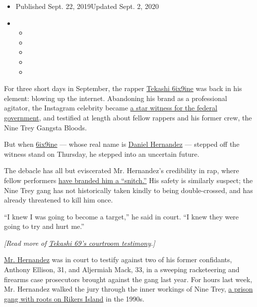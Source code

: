 \begin{itemize}
\item
  Published Sept. 22, 2019Updated Sept. 2, 2020
\item
  \begin{itemize}
  \item
  \item
  \item
  \item
  \item
  \end{itemize}
\end{itemize}

For three short days in September, the rapper
\href{https://www.nytimes3xbfgragh.onion/2020/09/02/arts/music/6ix9ine-interview.html}{Tekashi
6ix9ine} was back in his element: blowing up the internet. Abandoning
his brand as a professional agitator, the Instagram celebrity became
\href{https://www.nytimes3xbfgragh.onion/2019/09/19/nyregion/tekashi-69-case-testimony-jim-jones.html}{a
star witness for the federal government}, and testified at length about
fellow rappers and his former crew, the Nine Trey Gangsta Bloods.

But when
\href{https://www.nytimes3xbfgragh.onion/2019/12/18/nyregion/tekashi-69-sentenced.html}{6ix9ine}
--- whose real name is
\href{https://www.nytimes3xbfgragh.onion/2019/12/18/nyregion/tekashi-69-sentenced.html}{Daniel
Hernandez} --- stepped off the witness stand on Thursday, he stepped
into an uncertain future.

The debacle has all but eviscerated Mr. Hernandez's credibility in rap,
where fellow performers
\href{https://www.nytimes3xbfgragh.onion/2019/09/25/nyregion/tekashi69-crime-trial.html}{have
branded him a ``snitch.''} His safety is similarly suspect; the Nine
Trey gang has not historically taken kindly to being double-crossed, and
has already threatened to kill him once.

``I knew I was going to become a target,'' he said in court. ``I knew
they were going to try and hurt me.''

\emph{{[}Read more of}
\href{https://www.nytimes3xbfgragh.onion/2019/09/20/arts/music/tekashi-case-testimony.html}{\emph{Tekashi
69's courtroom testimony}}\emph{.{]}}

\href{https://www.nytimes3xbfgragh.onion/2019/10/03/nyregion/tekashi-69-guilty.html}{Mr.
Hernandez} was in court to testify against two of his former confidants,
Anthony Ellison, 31, and Aljermiah Mack, 33, in a sweeping racketeering
and firearms case prosecutors brought against the gang last year. For
hours last week, Mr. Hernandez walked the jury through the inner
workings of Nine Trey,
\href{https://www.nytimes3xbfgragh.onion/2019/09/30/nyregion/tekashi-69-trial-gang-violence.html}{a
prison gang with roots on Rikers Island} in the 1990s.

